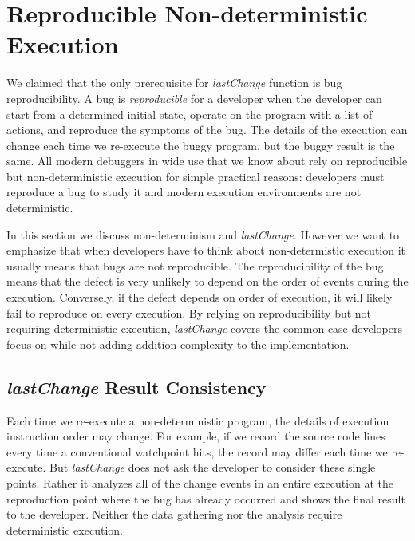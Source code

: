 \documentclass[runningheads,a4paper]{llncs}
\begin{document}

\section{Reproducible Non-deterministic Execution}
We claimed that the only prerequisite for \textit{lastChange} function is bug
reproducibility. A bug is \textit{reproducible} for a developer when the developer can
start from a determined initial state, operate on the program with a
list of actions, and reproduce the symptoms of the bug. The details of
the execution can change each time we re-execute the buggy program,
but the buggy result is the same.  All modern debuggers in wide use that we know 
about rely on reproducible but non-deterministic execution for simple practical reasons: 
developers must reproduce a bug to study it and modern execution environments 
are not deterministic.  

 In this section we discuss non-determinism and \textit{lastChange}. However we want 
to emphasize that when developers have to think about non-determistic execution 
it usually means that bugs are not reproducible. 
The reproducibility of the bug
means that the defect is very unlikely to depend on the order of
events during the execution. Conversely, if the defect depends on order of execution, 
it will likely fail to reproduce on every execution. By relying on reproducibility but 
not requiring deterministic execution, \textit{lastChange} covers the common case 
developers focus on while not adding addition complexity to the implementation.

\subsection{\textit{lastChange} Result Consistency}
Each time we re-execute a non-deterministic program, 
the details of execution instruction order may change. 
For example, if we record the source code lines every time
a conventional watchpoint hits, the record may differ each time we
re-execute. But \textit{lastChange} does not ask the developer to
consider these single points. Rather it analyzes all of the
change events in an entire execution at the reproduction point where the bug
has already occurred and shows the final result to the developer. 
Neither the data gathering nor the analysis require deterministic execution.
\end{document}
